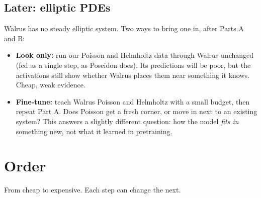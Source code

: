 \documentclass[11pt,a4paper]{article}
\begin{document}
\subsection{Later: elliptic PDEs}
\label{sec:elliptic}

Walrus has no steady elliptic system. Two ways to bring one in, after Parts A and B:
\begin{itemize}[itemsep=0.5em]
  \item \textbf{Look only:} run our Poisson and Helmholtz data through Walrus unchanged (fed as a single step, as Poseidon does).
  Its predictions will be poor, but the activations still show whether Walrus places them near something it knows.
  Cheap, weak evidence.
  \item \textbf{Fine-tune:} teach Walrus Poisson and Helmholtz with a small budget, then repeat Part A.
  Does Poisson get a fresh corner, or move in next to an existing system? This answers a slightly different question:
  how the model \emph{fits in} something new, not what it learned in pretraining.
\end{itemize}

\section{Order}

From cheap to expensive. Each step can change the next.
\end{document}
